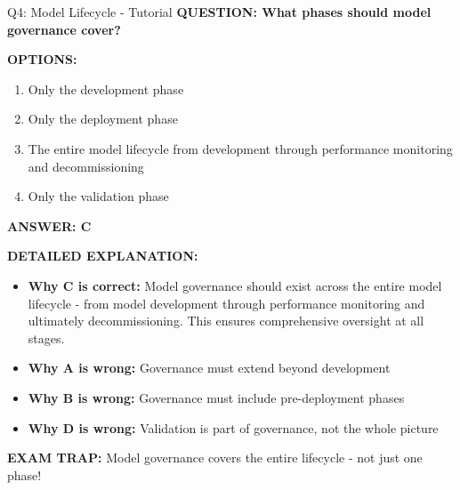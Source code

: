 \documentclass[8pt]{beamer}
\begin{document}
	\begin{frame}{Q4: Model Lifecycle - Tutorial}
		\fontsize{6.5}{7.5}\selectfont
		\textbf{QUESTION: What phases should model governance cover?}
		
		\vspace{0.1cm}
		\textbf{OPTIONS:}
		\begin{enumerate}
			\item Only the development phase
			\item Only the deployment phase
			\item The entire model lifecycle from development through performance monitoring and decommissioning
			\item Only the validation phase
		\end{enumerate}
		
		\vspace{0.1cm}
		\textcolor{myblue}{\textbf{ANSWER: C}}
		
		\vspace{0.1cm}
		\textbf{DETAILED EXPLANATION:}
		\begin{itemize}
			\item \textbf{Why C is correct:} Model governance should exist across the entire model lifecycle - from model development through performance monitoring and ultimately decommissioning. This ensures comprehensive oversight at all stages.
			\item \textbf{Why A is wrong:} Governance must extend beyond development
			\item \textbf{Why B is wrong:} Governance must include pre-deployment phases
			\item \textbf{Why D is wrong:} Validation is part of governance, not the whole picture
		\end{itemize}
		
		\textcolor{myred}{\textbf{EXAM TRAP:}} Model governance covers \textcolor{myblue}{the entire lifecycle} - not just one phase!
	\end{frame}
	
\end{document}

